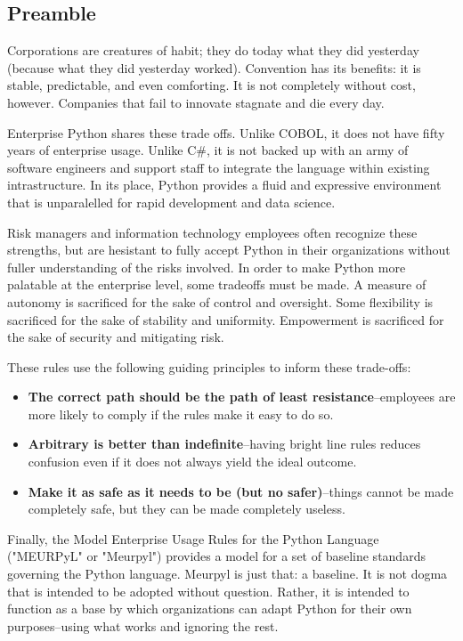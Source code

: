 

\subsection*{Preamble}
\thispagestyle{blank_style}

Corporations are creatures of habit; they do today what they did yesterday (because what they did yesterday worked). Convention has its benefits: it is stable, predictable, and even comforting. It is not completely without cost, however. Companies that fail to innovate stagnate and die every day.

Enterprise Python shares these trade offs. Unlike COBOL, it does not have fifty years of enterprise usage. Unlike C\#, it is not backed up with an army of software engineers and support staff to integrate the language within existing intrastructure. In its place, Python provides a fluid and expressive environment that is unparalelled for rapid development and data science.

Risk managers and information technology employees often recognize these strengths, but are hesistant to fully accept Python in their organizations without fuller understanding of the risks involved. In order to make Python more palatable at the enterprise level, some tradeoffs must be made. A measure of autonomy is sacrificed for the sake of control and oversight. Some flexibility is sacrificed for the sake of stability and uniformity. Empowerment is sacrificed for the sake of security and mitigating risk. 

These rules use the following guiding principles to inform these trade-offs:

\begin{itemize}
	\item \textbf{The correct path should be the path of least resistance}--employees are more likely to comply if the rules make it easy to do so.
	\item \textbf{Arbitrary is better than indefinite}--having bright line rules reduces confusion even if it does not always yield the ideal outcome.
	\item \textbf{Make it as safe as it needs to be (but no safer)}--things cannot be made completely safe, but they can be made completely useless.
\end{itemize}

Finally, the Model Enterprise Usage Rules for the Python Language ("MEURPyL" or "Meurpyl") provides a model for a set of baseline standards governing the Python language. Meurpyl is just that: a baseline. It is not dogma that is intended to be adopted without question. Rather, it is intended to function as a base by which organizations can adapt Python for their own purposes--using what works and ignoring the rest.
